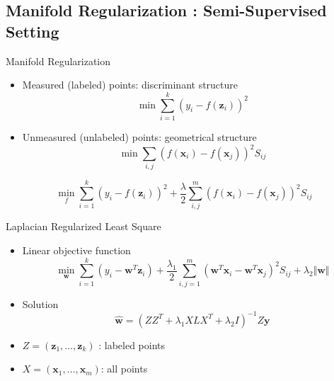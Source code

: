 \documentclass{beamer}
\newcommand{\bol}[1]{\textbf{#1}}
\begin{document}
\begin{darkframes}
   \section{Manifold Regularization : Semi-Supervised Setting}
   \begin{frame}{Manifold Regularization}
   \begin{itemize}
   	\item \alert{Measured (labeled)} points: discriminant structure\\
   	\begin{displaymath}
   		\min\sum_{i = 1}^k\left(y_i - f(\bol{z}_i)\right)^2
   	\end{displaymath}
	\item \alert{Unmeasured (unlabeled)} points: geometrical structure\\
	\begin{displaymath}
		\min\sum_{i,j}\left(f(\bol{x}_i) - f(\bol{x}_j)\right)^2S_{ij}
	\end{displaymath}
   \end{itemize}
   \begin{displaymath}
   		\min_f\sum_{i = 1}^k\left(y_i - f(\bol{z}_i)\right)^2 + \frac{\lambda}{2}\sum_{i,j}^m\left(f(\bol{x}_i) - f(\bol{x}_j)\right)^2S_{ij}
   \end{displaymath}
   \end{frame}
   
  \begin{frame}{Laplacian Regularized Least Square}
  \begin{itemize}
  \item Linear objective function
  \begin{displaymath}
  	\min_{\bol{w}}\sum_{i=1}^k\left( y_i - \bol{w}^T\bol{z}_i \right) + \frac{\lambda_1}{2}\sum_{i,j=1}^m\left(  \bol{w}^T\bol{x}_i - \bol{w}^T\bol{x}_j  \right)^2S_{ij} + \lambda_2\Vert\bol{w}\Vert
  \end{displaymath}
  \item Solution
  \begin{displaymath}
  	\widehat{\bol{w}} = \left(  ZZ^T + \lambda_1XLX^T + \lambda_2I  \right)^{-1}Z\bol{y}
  \end{displaymath}
  \item $Z=(\bol{z}_1,\ldots,\bol{z}_k)$ : labeled points
  \item $X=(\bol{x}_1, \ldots, \bol{x}_m)$: all points
  \end{itemize}
  \end{frame}
  

\end{darkframes}
\end{document}

